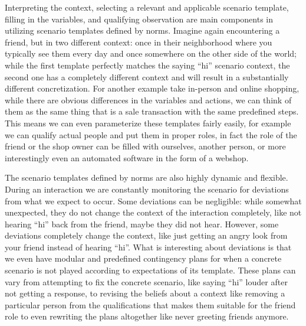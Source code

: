Interpreting the context, selecting a relevant and applicable scenario template, filling in the variables, and qualifying observation are main components in utilizing scenario templates defined by norms. Imagine again encountering a friend, but in two different context: once in their neighborhood where you typically see them every day and once somewhere on the other side of the world; while the first template perfectly matches the saying ``hi'' scenario context, the second one has a completely different context and will result in a substantially different concretization. For another example take in-person and online shopping, while there are obvious differences in the variables and actions, we can think of them as the same thing that is a sale transaction with the same predefined steps. This means we can even parameterize these templates fairly easily, for example we can qualify actual people and put them in proper roles, in fact the role of the friend or the shop owner can be filled with ourselves, another person, or more interestingly even an automated software in the form of a webshop.


The scenario templates defined by norms are also highly dynamic and flexible. During an interaction we are constantly monitoring the scenario for deviations from what we expect to occur. Some deviations can be negligible: while somewhat unexpected, they do not change the context of the interaction completely, like not hearing ``hi'' back from the friend, maybe they did not hear. However, some deviations completely change the context, like just getting an angry look from your friend instead of hearing ``hi''. What is interesting about deviations is that we even have modular and predefined contingency plans for when a concrete scenario is not played according to expectations of its template. These plans can vary from attempting to fix the concrete scenario, like saying ``hi'' louder after not getting a response, to revising the beliefs about a context like removing a particular person from the qualifications that makes them suitable for the friend role to even rewriting the plans altogether like never greeting friends anymore.


